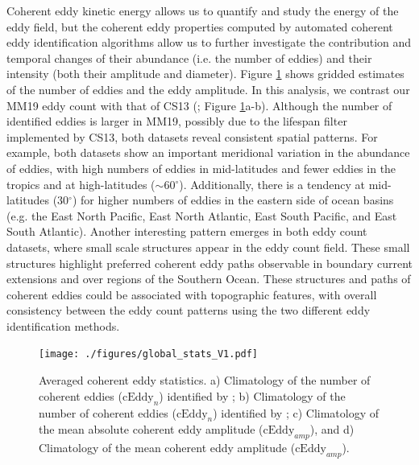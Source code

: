 \documentclass[draft,linenumbers]{agujournal2019}
\newcommand{\cEddy}{\textrm{cEddy}}
\begin{document}
	Coherent eddy kinetic energy allows us to quantify and study the energy of the eddy field, but the coherent eddy properties computed by automated coherent eddy identification algorithms allow us to further investigate the contribution and temporal changes of their abundance (i.e. the number of eddies) and their intensity (both their amplitude and diameter). 
	Figure \ref{fig:eddy_stats_climatology} shows gridded estimates of the number of eddies and the eddy amplitude. 
	In this analysis, we contrast our MM19 eddy count with that of CS13 (\citealp{Chelton_Global_2007}; Figure \ref{fig:eddy_stats_climatology}a-b). Although the number of identified eddies is larger in MM19, possibly due to the lifespan filter implemented by CS13, both datasets reveal consistent spatial patterns. 
	For example, both datasets show an important meridional variation in the abundance of eddies, with high numbers of eddies in mid-latitudes and fewer eddies in the tropics and at high-latitudes ($\sim$60$^\circ$). Additionally, there is a tendency at mid-latitudes (30$^\circ$) for higher numbers of eddies in the eastern side of ocean basins (e.g. the East North Pacific, East North Atlantic, East South Pacific, and East South Atlantic). 
	Another interesting pattern emerges in both eddy count datasets, where small scale structures appear in the eddy count field. 
	These small structures highlight preferred coherent eddy paths observable in boundary current extensions and over regions of the Southern Ocean. 
	These structures and paths of coherent eddies could be associated with topographic features, with overall consistency between the eddy count patterns using the two different eddy identification methods.
	
	\begin{figure}
	    \centering
	    \texttt{[image: ./figures/global\_stats\_V1.pdf]}
	    \caption{Averaged coherent eddy statistics. a) Climatology of the number of coherent eddies ($\cEddy_n$) identified by \citet{Chelton_Global_2007};  b) Climatology of the number of coherent eddies ($\cEddy_n$) identified by \citet{Martinez_TKE_2019}; c) Climatology of the mean absolute coherent eddy amplitude ($\cEddy_{amp}$), and d) Climatology of the mean coherent eddy amplitude ($\cEddy_{amp}$).}
	    \label{fig:eddy_stats_climatology}
	\end{figure}
	
\end{document}
